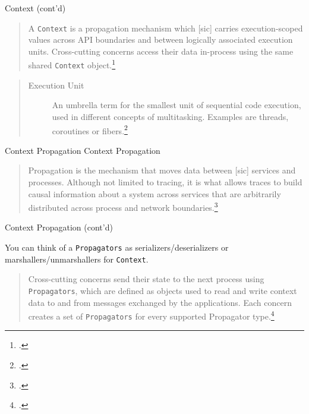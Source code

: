 \documentclass[aspectratio=169]{beamer}
\begin{document}
\begin{frame}{Context (cont'd)}
  \begin{quote}

    A \lstinline{Context} is a propagation mechanism which [sic] carries
    execution-scoped values across API boundaries and between logically
    associated execution units. Cross-cutting concerns access their data
    in-process using the same shared \lstinline{Context}
    object.\footcite{otel-context}

  \end{quote}

  \vspace{1em}

  \begin{quote}

    \begin{description}
      \item[Execution Unit] An umbrella term for the smallest unit of sequential
        code execution, used in different concepts of multitasking. Examples are
        threads, coroutines or fibers.\footcite{otel-defs}
    \end{description}

  \end{quote}

\end{frame}

\begin{frame}{Context Propagation}
  Context Propagation

  \vspace{1em}

  \begin{quote}

    Propagation is the mechanism that moves data between [sic] services and
    processes. Although not limited to tracing, it is what allows traces to
    build causal information about a system across services that are arbitrarily
    distributed across process and network
    boundaries.\footcite{otel-propagation}

  \end{quote}
\end{frame}


\begin{frame}{Context Propagation (cont'd)}

  You can think of a \lstinline{Propagators} as serializers/deserializers or
  marshallers/unmarshallers for \lstinline{Context}.

  \begin{quote}

    Cross-cutting concerns send their state to the next process using
    \lstinline{Propagators}, which are defined as objects used to read and write
    context data to and from messages exchanged by the applications. Each
    concern creates a set of \lstinline{Propagators} for every supported
    Propagator type.\footcite{otel-propagators}

  \end{quote}
\end{frame}
\end{document}

